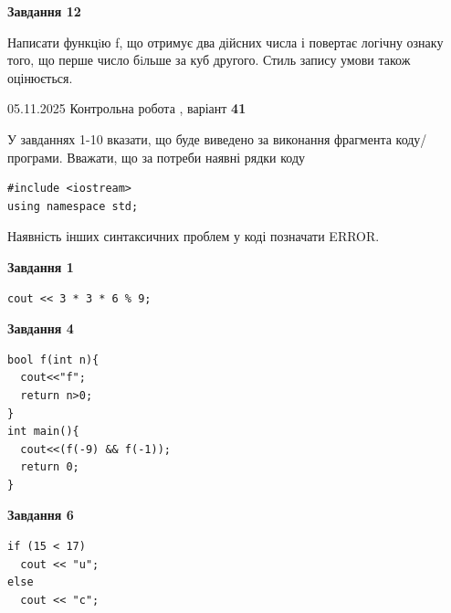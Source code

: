 \documentclass[12pt, ukrainian]{article}
\begin{document}
{\begin {large}
\begin{minipage}[t]{11.0cm}
\begin{center}
\textbf{Завдання 12}
\end{center}

Написати функцiю f, що отримує два дійсних числа і повертає логічну ознаку того, що перше число бiльше за куб другого. Стиль запису умови також оцінюється.\par

\end{minipage}

\end {large}}
\newpage

{\Large{05.11.2025 Контрольна робота , варіант  \No \textbf { 41 }\par}}
{
\begin {large}
У завданнях 1-10 вказати, що буде виведено за виконання фрагмента коду/про\-гра\-ми.
Вважати, що за потреби наявні рядки коду
\begin{verbatim}
#include <iostream>
using namespace std;
\end{verbatim}
Наявність інших синтаксичних проблем у коді позначати ERROR.

\begin{minipage}[t]{7.0cm}

\begin{center}
\textbf{Завдання 1}
\end{center}
\vspace{-8mm}

\begin{verbatim}
cout << 3 * 3 * 6 % 9;
\end{verbatim}



\begin{center}
\textbf{Завдання 4}
\end{center}
\vspace{-8mm}

\begin{verbatim}
bool f(int n){
  cout<<"f";
  return n>0;
}
int main(){
  cout<<(f(-9) && f(-1));
  return 0;
}
\end{verbatim}



\begin{center}
\textbf{Завдання 6}
\end{center}
\vspace{-8mm}

\begin{verbatim}
if (15 < 17)
  cout << "u";
else
  cout << "c";
\end{verbatim}




\end{minipage}
\end{large}}
\end{document}
